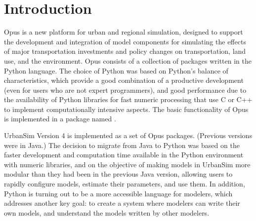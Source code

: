 
\chapter{Introduction}
\label{chapter:introduction}


Opus is a new platform for urban and regional simulation, designed to
support the development and integration of model
components  for simulating the
effects of major transportation investments and policy changes
on transportation,  land use, 
and the environment. 
Opus consists of a collection of packages 
written in the Python \pythonindex language. The choice of
Python \pythonindex was based on Python's \pythonindex
balance of characteristics, which provide a good combination of a
productive development (even for users who are not expert programmers), and
good performance  due to the availability of Python \pythonindex
libraries  for fast
numeric processing  that use C \cindex or C++ \cppindex
to implement computationally intensive
aspects.  The basic functionality of Opus is implemented in a package named .

UrbanSim Version 4  is implemented as a set of
Opus packages. (Previous versions  were in Java.) \javaindex
The decision to migrate from Java \javaindex to Python \pythonindex
was based on the faster development and computation time available
in the Python \pythonindex environment with numeric libraries, and on the objective of
making models  in UrbanSim more modular than they had been in the previous
Java \javaindex version, allowing users to rapidly configure models,  estimate their
parameters, and use them. In addition, Python \pythonindex is turning out to be a more
accessible language for modelers, which addresses another key goal:  to
create a system where modelers can write their own models, and understand
the models written by other modelers.

